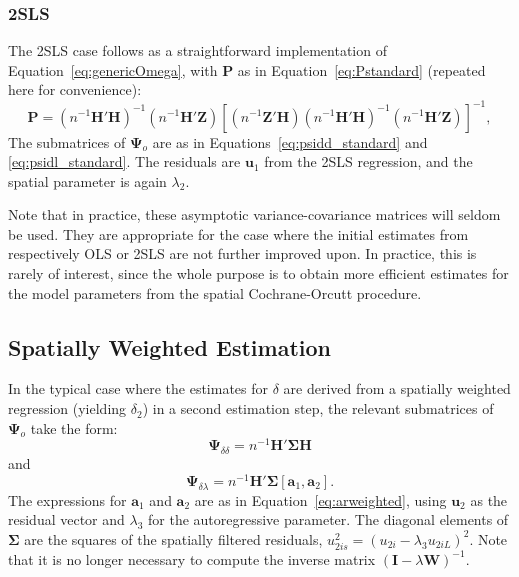 \documentclass{article}
\begin{document}
\subsubsection{2SLS}\label{ss:asyvar2sls}
The 2SLS case follows as a straightforward implementation of Equation~\ref{eq:genericOmega},
with $\mathbf{P}$ as in Equation~\ref{eq:Pstandard} (repeated here for convenience):
\begin{equation*}
\mathbf{P} = (n^{-1}\mathbf{H'H})^{-1} ( n^{-1} \mathbf{H'Z} ) 
        [ (n^{-1} \mathbf{Z'H} ) (n^{-1} \mathbf{H'H} )^{-1} (n^{-1} \mathbf{H'Z}) ]^{-1},
\end{equation*}
The submatrices of $\mathbf{\Psi}_o$ are as in Equations~\ref{eq:psidd_standard}
and \ref{eq:psidl_standard}. The residuals are $\mathbf{u}_1$ from the 2SLS regression,
and the spatial parameter is again $\lambda_2$.

Note that in practice, these asymptotic variance-covariance matrices will seldom
be used. They are appropriate for the case where the initial estimates from respectively
OLS or 2SLS are not further improved upon. In practice, this is rarely of interest,
since the whole purpose is to obtain more efficient estimates for the model parameters
from the spatial Cochrane-Orcutt procedure.

\subsection{Spatially Weighted Estimation}\label{ss:asyvarweighted}
In the typical case where the estimates for $\delta$ are derived from a spatially weighted
regression (yielding $\delta_2$) in a second estimation
step, the relevant submatrices of $\mathbf{\Psi}_o$ take the form:
\begin{equation}\label{eq:psidd_weighted}
\mathbf{\Psi}_{\delta \delta} = n^{-1} \mathbf{H'}  \mathbf{\Sigma}
 \mathbf{H}
\end{equation}
and
\begin{equation}\label{eq:psidl_weighted}
\mathbf{\Psi}_{\delta \lambda} = n^{-1} \mathbf{H'} \mathbf{\Sigma} [ \mathbf{a}_1, \mathbf{a}_2 ].
\end{equation}
The expressions for $\mathbf{a}_1$ and $\mathbf{a}_2$ are as in Equation~\ref{eq:arweighted}, using  $\mathbf{u}_2$ as the residual vector and $\lambda_3$ for the 
autoregressive parameter. The diagonal elements
of $\mathbf{\Sigma}$ are the squares of the spatially filtered residuals, $u_{2is}^2 = (u_{2i} - \lambda_3 u_{2iL} )^{2}$.
Note that it is no longer necessary to compute the inverse matrix $( \mathbf{I} - \lambda \mathbf{W} )^{-1}$. 
\end{document}
